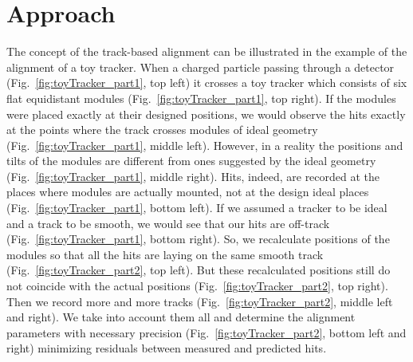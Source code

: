 \section{Approach}
\label{sec:alignmentAlg}




The concept of the track-based alignment can be illustrated in the example of the alignment of a toy tracker. When a charged particle passing through a detector (Fig.~\ref{fig:toyTracker_part1}, top left) it crosses a toy tracker which consists of six flat equidistant modules (Fig.~\ref{fig:toyTracker_part1}, top right). If the modules were placed exactly at their designed positions, we would observe the hits exactly at the points where the track crosses modules of ideal geometry (Fig.~\ref{fig:toyTracker_part1}, middle left). However, in a reality the positions and tilts of the modules are different from ones suggested by the ideal geometry (Fig.~\ref{fig:toyTracker_part1}, middle right). Hits, indeed, are recorded at the places where modules are actually mounted, not at the design ideal places (Fig.~\ref{fig:toyTracker_part1}, bottom left). If we assumed a tracker to be ideal and a track to be smooth, we would see that our hits are off-track (Fig.~\ref{fig:toyTracker_part1}, bottom right). So, we recalculate positions of the modules so that all the hits are laying on the same smooth track (Fig.~\ref{fig:toyTracker_part2}, top left). But these recalculated positions still do not coincide with the actual positions (Fig.~\ref{fig:toyTracker_part2}, top right). Then we record more and more tracks (Fig.~\ref{fig:toyTracker_part2}, middle left and right). We take into account them all and determine the alignment parameters with necessary precision (Fig.~\ref{fig:toyTracker_part2}, bottom left and right) minimizing residuals between measured and predicted hits.

